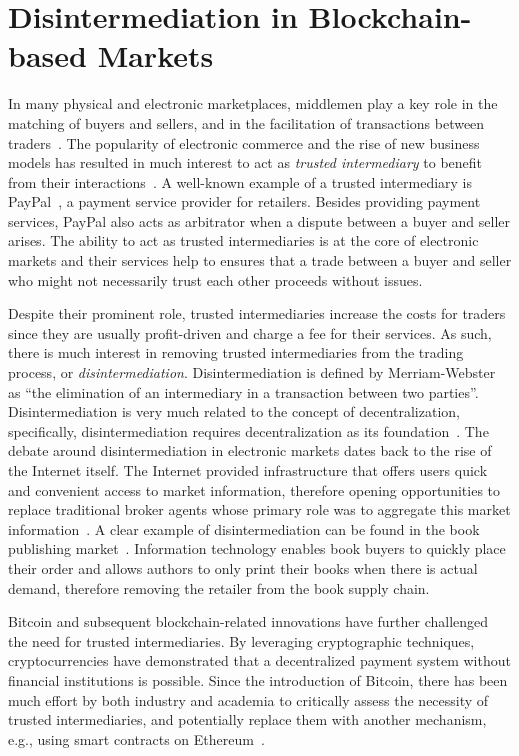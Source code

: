\section{Disintermediation in Blockchain-based Markets}
In many physical and electronic marketplaces, middlemen play a key role in the matching of buyers and sellers, and in the facilitation of transactions between traders~\cite{bakos1998emerging}.
The popularity of electronic commerce and the rise of new business models has resulted in much interest to act as \emph{trusted intermediary} to benefit from their interactions~\cite{clark1999electronic}.
A well-known example of a trusted intermediary is PayPal~\cite{paypal}, a payment service provider for retailers.
Besides providing payment services, PayPal also acts as arbitrator when a dispute between a buyer and seller arises.
The ability to act as trusted intermediaries is at the core of electronic markets and their services help to ensures that a trade between a buyer and seller who might not necessarily trust each other proceeds without issues.

Despite their prominent role, trusted intermediaries increase the costs for traders since they are usually profit-driven and charge a fee for their services.
As such, there is much interest in removing trusted intermediaries from the trading process, or \emph{disintermediation}.
Disintermediation is defined by Merriam-Webster as \enquote{the elimination of an intermediary in a transaction between two parties}.
Disintermediation is very much related to the concept of decentralization, specifically, disintermediation requires decentralization as its foundation~\cite{guo2016blockchain}.
The debate around disintermediation in electronic markets dates back to the rise of the Internet itself. %
The Internet provided infrastructure that offers users quick and convenient access to market information, therefore opening opportunities to replace traditional broker agents whose primary role was to aggregate this market information~\cite{wigand2020whatever}.
A clear example of disintermediation can be found in the book publishing market~\cite{giaglis1999disintermediation}.
Information technology enables book buyers to quickly place their order and allows authors to only print their books when there is actual demand, therefore removing the retailer from the book supply chain.

Bitcoin and subsequent blockchain-related innovations have further challenged the need for trusted intermediaries.
By leveraging cryptographic techniques, cryptocurrencies have demonstrated that a decentralized payment system without financial institutions is possible.
Since the introduction of Bitcoin, there has been much effort by both industry and academia to critically assess the necessity of trusted intermediaries, and potentially replace them with another mechanism, e.g., using smart contracts on Ethereum~\cite{lande2018sok}.

